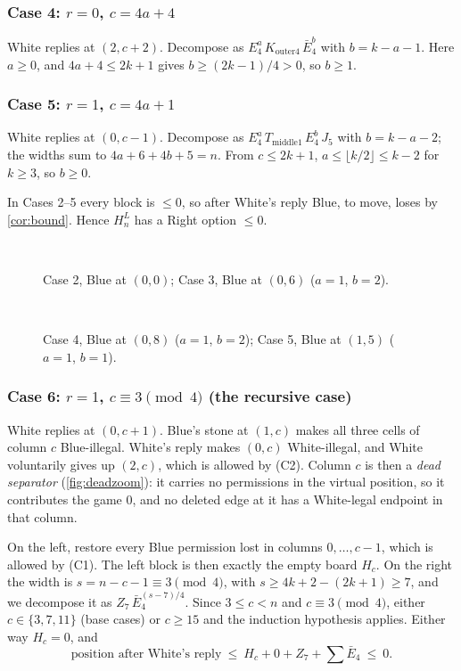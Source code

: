\documentclass[11pt]{amsart}
\theoremstyle{definition}
\newcommand{\Ebar}{\bar E_4}
\newcommand{\Kfour}{K_{\mathrm{outer4}}}
\newcommand{\Tm}{T_{\mathrm{middle1}}}
\begin{document}
\subsubsection*{Case 4: $r=0$, $c=4a+4$}
White replies at $(2,c+2)$. Decompose as $E_4^a\,\Kfour\,\Ebar^b$ with
$b=k-a-1$. Here $a\ge0$, and $4a+4\le 2k+1$ gives $b\ge(2k-1)/4>0$, so
$b\ge1$.

\subsubsection*{Case 5: $r=1$, $c=4a+1$}
White replies at $(0,c-1)$. Decompose as $E_4^a\,\Tm\,E_4^b\,J_5$ with
$b=k-a-2$; the widths sum to $4a+6+4b+5=n$. From $c\le 2k+1$,
$a\le\lfloor k/2\rfloor\le k-2$ for $k\ge3$, so $b\ge0$.

In Cases 2--5 every block is $\le 0$, so after White's reply Blue, to move,
loses by \cref{cor:bound}. Hence $H_n^L$ has a Right option $\le0$.

\begin{figure}[ht]
\centering
{}\\[6pt]
\caption{Case 2, Blue at $(0,0)$; Case 3, Blue at $(0,6)$ ($a=1$, $b=2$).}
\label{fig:case23}
\end{figure}

\begin{figure}[ht]
\centering
{}\\[6pt]
\caption{Case 4, Blue at $(0,8)$ ($a=1$, $b=2$); Case 5, Blue at $(1,5)$
($a=1$, $b=1$).}
\label{fig:case45}
\end{figure}

\subsubsection*{Case 6: $r=1$, $c\equiv3\pmod 4$ (the recursive case)}
White replies at $(0,c+1)$. Blue's stone at $(1,c)$ makes all three cells of
column $c$ Blue-illegal. White's reply makes $(0,c)$ White-illegal, and White
voluntarily gives up $(2,c)$, which is allowed by (C2). Column $c$ is then a
\emph{dead separator} (\cref{fig:deadzoom}): it carries no permissions in the
virtual position, so it contributes the game $0$, and no deleted edge at it
has a White-legal endpoint in that column.

On the left, restore every Blue permission lost in columns $0,\dots,c-1$,
which is allowed by (C1). The left block is then exactly the empty board
$H_c$. On the right the width is $s=n-c-1\equiv3\pmod4$, with
$s\ge 4k+2-(2k+1)\ge7$, and we decompose it as $Z_7\,\Ebar^{(s-7)/4}$.
Since $3\le c<n$ and $c\equiv3\pmod 4$, either $c\in\{3,7,11\}$ (base cases) or
$c\ge15$ and the induction hypothesis applies. Either way $H_c=0$, and
\[
\text{position after White's reply}\ \le\ H_c+0+Z_7+\sum\Ebar\ \le\ 0 .
\]
\end{document}

